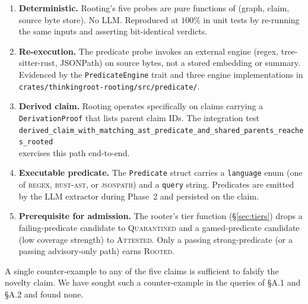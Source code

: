 \documentclass[10pt,a4paper]{article}
\begin{document}
\begin{enumerate}[leftmargin=*,itemsep=3pt,topsep=2pt]
  \item \textbf{Deterministic.} Rooting's five probes are pure functions
        of (graph, claim, source byte store). No LLM. Reproduced at
        $100\%$ in unit tests by re-running the same inputs and
        asserting bit-identical verdicts.
  \item \textbf{Re-execution.} The predicate probe invokes an external
        engine (regex, tree-sitter-rust, JSONPath) on source bytes, not
        a stored embedding or summary. Evidenced by the
        \texttt{PredicateEngine} trait and three engine implementations
        in \texttt{crates/thinkingroot-rooting/src/predicate/}.
  \item \textbf{Derived claim.} Rooting operates specifically on
        claims carrying a \texttt{DerivationProof} that lists parent
        claim IDs. The integration test\\
        \hspace*{1em}\texttt{\scriptsize derived\_claim\_with\_matching\_ast\_predicate\_\-and\_shared\_parents\_reaches\_rooted}\\
        exercises this path end-to-end.
  \item \textbf{Executable predicate.} The \texttt{Predicate} struct
        carries a \texttt{language} enum (one of \textsc{regex},
        \textsc{rust-ast}, or \textsc{jsonpath}) and a \texttt{query}
        string. Predicates are emitted by the LLM extractor during
        Phase~2 and persisted on the claim.
  \item \textbf{Prerequisite for admission.} The rooter's tier function
        (§\ref{sec:tiers}) drops a failing-predicate candidate to
        \textsc{Quarantined} and a gamed-predicate candidate (low
        coverage strength) to \textsc{Attested}. Only a passing
        strong-predicate (or a passing advisory-only path) earns
        \textsc{Rooted}.
\end{enumerate}

A single counter-example to any of the five claims is sufficient to
falsify the novelty claim. We have sought such a counter-example in the
queries of §A.1 and §A.2 and found none.



\end{document}
